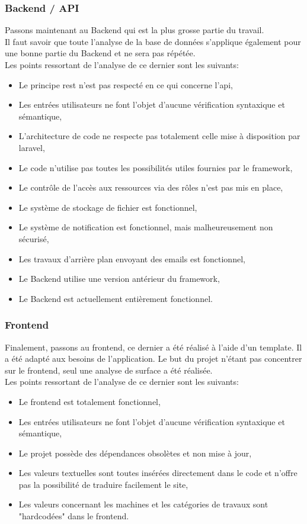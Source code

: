 \documentclass[
    iai, %
    il, %
]{heig-tb}
\begin{document}
\subsubsection{Backend / API}
Passons maintenant au Backend qui est la plus grosse partie du travail.\\
Il faut savoir que toute l'analyse de la base de données s'applique également pour une bonne partie du Backend et ne sera pas répétée.\\
Les points ressortant de l'analyse de ce dernier sont les suivants:
\begin{itemize}
    \item Le principe \Gls{rest} n'est pas respecté en ce qui concerne l'\Gls{api},
    \item Les entrées utilisateurs ne font l'objet d'aucune vérification syntaxique et sémantique,
    \item L'architecture de code ne respecte pas totalement celle mise à disposition par \Gls{laravel},
    \item Le code n'utilise pas toutes les possibilités utiles fournies par le \gls{framework},
    \item Le contrôle de l'accès aux ressources via des rôles n'est pas mis en place,
    \item Le système de stockage de fichier est fonctionnel,
    \item Le système de notification est fonctionnel, mais malheureusement non sécurisé,
    \item Les travaux d'arrière plan envoyant des emails est fonctionnel,
    \item Le Backend utilise une version antérieur du framework,
    \item Le Backend est actuellement entièrement fonctionnel.
\end{itemize}

\subsubsection{Frontend}
Finalement, passons au frontend, ce dernier a été réalisé à l'aide d'un \gls{template}. Il a été adapté aux besoins de l'application. Le but du projet n'étant pas concentrer sur le frontend, seul une analyse de surface a été réalisée.\\
Les points ressortant de l'analyse de ce dernier sont les suivants:
\begin{itemize}
    \item Le frontend est totalement fonctionnel,
    \item Les entrées utilisateurs ne font l'objet d'aucune vérification syntaxique et sémantique,
    \item Le projet possède des dépendances obsolètes et non mise à jour,
    \item Les valeurs textuelles sont toutes insérées directement dans le code et n'offre pas la possibilité de traduire facilement le site,
    \item Les valeurs concernant les machines et les catégories de travaux sont "hardcodées" dans le frontend.
\end{itemize}
\end{document}
